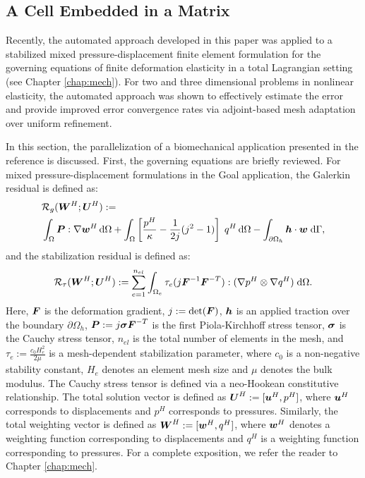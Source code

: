 \subsection{A Cell Embedded in a Matrix}
\label{ssec:aut_mech_glial}

Recently, the automated approach developed in this paper was applied
to a stabilized mixed pressure-displacement finite element formulation
\cite{ramesh2005stabilized} for the governing equations of finite
deformation elasticity in a total Lagrangian setting
\cite{granzow2017adjoint} (see Chapter \ref{chap:mech}).
For two and three dimensional problems in
nonlinear elasticity, the automated approach was shown to effectively
estimate the error and provide improved error convergence rates via
adjoint-based mesh adaptation over uniform refinement.

In this section, the parallelization of a biomechanical application
presented in the reference \cite{granzow2017adjoint} is discussed. First,
the governing equations are briefly reviewed. For mixed pressure-displacement
formulations in the Goal application, the Galerkin residual is
defined as:
%
\begin{gather}
\begin{aligned}
&\mathcal{R}_g(\boldsymbol{W}^H ; \boldsymbol{U}^H) := \\
&\int_{\Omega} \boldsymbol{P} : \nabla \boldsymbol{w}^H \, \text{d} \Omega +
\int_{\Omega} \left[ \frac{p^H}{\kappa} - \frac{1}{2 j}(j^2 - 1) \right] \;
q^H \, \text{d} \Omega -
\int_{\partial \Omega_h} \boldsymbol{h} \cdot \boldsymbol{w} \; \text{d} \Gamma,
\end{aligned}
\label{aut:mech_galerkin}
\end{gather}
%
and the stabilization residual is defined as:
%
\begin{gather}
\mathcal{R}_{\tau}(\boldsymbol{W}^H ; \boldsymbol{U}^H) :=
\sum_{e=1}^{n_{el}} \int_{\Omega_e} \tau_e
(j \boldsymbol{F}^{-1} \boldsymbol{F}^{-T}) : (\nabla p^H \otimes \nabla q^H) \;
\text{d} \Omega.
\label{aut_mech_stabilized}
\end{gather}
%
Here, $\boldsymbol{F}$ is the deformation gradient, $j := \text{det}(\boldsymbol{F})$,
$\boldsymbol{h}$ is an applied traction over the boundary $\partial \Omega_h$,
$\boldsymbol{P} := j \boldsymbol{\sigma} \boldsymbol{F}^{-T}$ is the first Piola-Kirchhoff
stress tensor, $\boldsymbol{\sigma}$ is the Cauchy stress tensor, $n_{el}$
is the total number of elements in the mesh, and $\tau_e :=
\frac{c_0 H_e^2}{2 \mu}$ is a mesh-dependent stabilization parameter,
where $c_0$ is a non-negative stability constant, $H_e$ denotes an
element mesh size and $\mu$ denotes the bulk modulus.
The Cauchy stress tensor is defined via a neo-Hookean constitutive
relationship.  The total
solution vector is defined as $\boldsymbol{U}^H := [\boldsymbol{u}^H, p^H]$, where
$\boldsymbol{u}^H$ corresponds to displacements and $p^H$ corresponds to
pressures. Similarly, the total weighting vector is defined as
$\boldsymbol{W}^H := [\boldsymbol{w}^H, q^H]$, where $\boldsymbol{w}^H$ denotes a weighting
function corresponding to displacements and $q^H$ is a weighting
function corresponding to pressures. For a complete
exposition, we refer the reader to Chapter \ref{chap:mech}.

